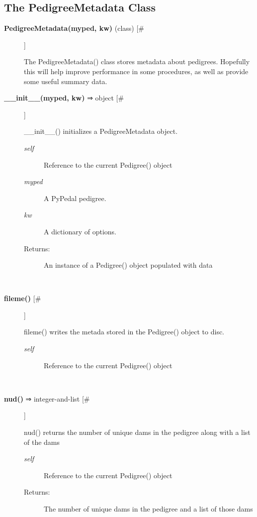 \subsection*{The PedigreeMetadata Class}
\begin{description}
\item[\textbf{PedigreeMetadata(myped, kw)}
 (class) [\#]]

 The PedigreeMetadata() class stores metadata about pedigrees. Hopefully this will help improve performance in some procedures, as well as provide some useful summary data.

\item[\textbf{\_\_init\_\_(myped, kw)}
 ⇒ object [\#]]

 \_\_init\_\_() initializes a PedigreeMetadata object.
\begin{description}
\item[\emph{self}
] Reference to the current Pedigree() object
\item[\emph{myped}
] A PyPedal pedigree.
\item[\emph{kw}
] A dictionary of options.
\item[Returns:] An instance of a Pedigree() object populated with data

\end{description}
\\ 

\item[\textbf{fileme()}
 [\#]]

 fileme() writes the metada stored in the Pedigree() object to disc.
\begin{description}
\item[\emph{self}
] Reference to the current Pedigree() object

\end{description}
\\ 

\item[\textbf{nud()}
 ⇒ integer-and-list [\#]]

 nud() returns the number of unique dams in the pedigree along with a list of the dams
\begin{description}
\item[\emph{self}
] Reference to the current Pedigree() object
\item[Returns:] The number of unique dams in the pedigree and a list of those dams

\end{description}
\\ 


\end{description}
